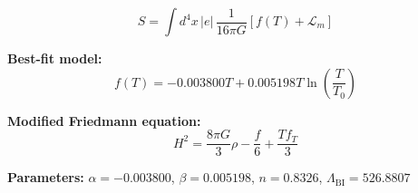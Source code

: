 
\begin{equation}
  S = \int d^4x \, |e| \, \frac{1}{16\pi G} \left[ f(T) + \mathcal{L}_m \right]
\end{equation}

\textbf{Best-fit model:}
\begin{equation}
  f(T) = -0.003800 T + 0.005198 T \ln\!\left(\frac{T}{T_0}\right)
\end{equation}

\textbf{Modified Friedmann equation:}
\begin{equation}
  H^2 = \frac{8\pi G}{3} \rho - \frac{f}{6} + \frac{T f_T}{3}
\end{equation}

\textbf{Parameters:}
$\alpha = -0.003800$, \quad
$\beta = 0.005198$, \quad
$n = 0.8326$, \quad
$\Lambda_{\text{BI}} = 526.8807$